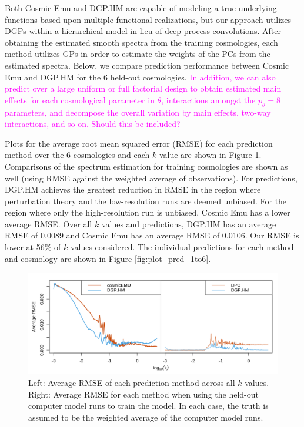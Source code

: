 \documentclass[11pt]{article}
\begin{document}
Both Cosmic Emu and DGP.HM are capable of modeling a true underlying functions based upon multiple functional realizations, but our approach utilizes DGPs within a hierarchical model in lieu of deep process convolutions. After obtaining the estimated smooth spectra from the training cosmologies, each method utilizes GPs in order to estimate the weights of the PCs from the estimated spectra. Below, we compare prediction performance between Cosmic Emu and DGP.HM for the 6 held-out cosmologies. \textcolor{magenta}{In addition, we can also predict over a large uniform or full factorial design to obtain estimated main effects for each cosmological parameter in $\theta$, interactions amongst the $p_\theta=8$ parameters, and decompose the overall variation by main effects, two-way interactions, and so on. Should this be included?}

Plots for the average root mean squared error (RMSE) for each prediction method over the 6 cosmologies and each $k$ value are shown in Figure \ref{fig:plot_rmse_k}. Comparisons of the spectrum estimation for training cosmologies are shown as well (using RMSE against the weighted average of observations). For predictions, DGP.HM achieves the greatest reduction in RMSE in the region where perturbation theory and the low-resolution runs are deemed unbiased. For the region where only the high-resolution run is unbiased, Cosmic Emu has a lower average RMSE. Over all $k$ values and predictions, DGP.HM has an average RMSE of 0.0089 and Cosmic Emu has an average RMSE of 0.0106. Our RMSE is lower at 56\% of $k$ values considered. The individual predictions for each method and cosmology are shown in Figure \ref{fig:plot_pred_1to6}.

\begin{figure}[ht]
    \centering
    \includegraphics[width=6in]{rmse_by_k.png}
    \caption{Left: Average RMSE of each prediction method across all $k$ values. Right: Average RMSE for each method when using the held-out computer model runs to train the model. In each case, the truth is assumed to be the weighted average of the computer model runs.}
    \label{fig:plot_rmse_k}
\end{figure}
\end{document}
